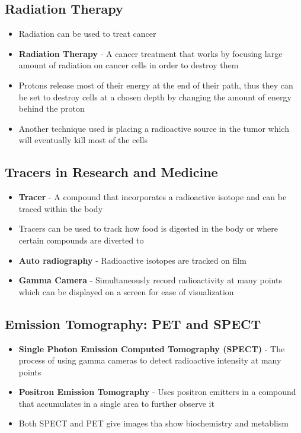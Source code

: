 \subsection{Radiation Therapy}
\begin{itemize}
    \item Radiation can be used to treat cancer
    \item \textbf{Radiation Therapy} - A cancer treatment that works by focusing large amount of radiation on cancer cells in order to destroy them
    \item Protons release most of their energy at the end of their path, thus they can be set to destroy cells at a chosen depth by changing the amount of energy behind the proton
    \item Another technique used is placing a radioactive source in the tumor which will eventually kill most of the cells
\end{itemize}

\subsection{Tracers in Research and Medicine}
\begin{itemize}
    \item \textbf{Tracer} - A compound that incorporates a radioactive isotope and can be traced within the body
    \item Tracers can be used to track how food is digested in the body or where certain compounds are diverted to
    \item \textbf{Auto radiography} - Radioactive isotopes are tracked on film
    \item \textbf{Gamma Camera} - Simultaneously record radioactivity at many points which can be displayed on a screen for ease of visualization
\end{itemize}

\subsection{Emission Tomography: PET and SPECT}
\begin{itemize}
    \item \textbf{Single Photon Emission Computed Tomography (SPECT)} - The process of using gamma cameras to detect radioactive intensity at many points
    \item\textbf{Positron Emission Tomography} - Uses positron emitters in a compound that accumulates in a single area to further observe it
    \item Both SPECT and PET give images tha show biochemistry and metablism
\end{itemize}

